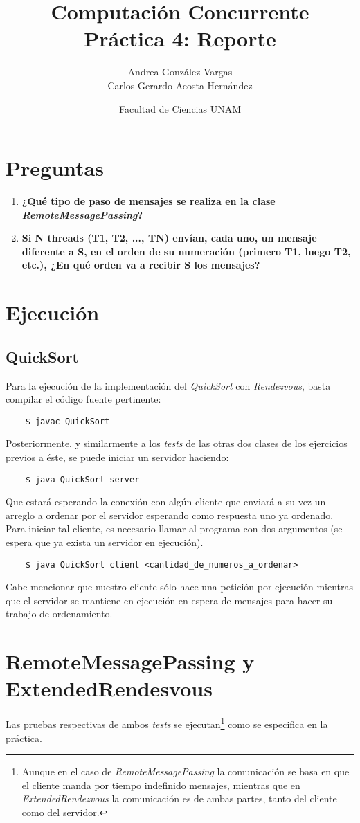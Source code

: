 \documentclass[12pt]{article}
\title{Computación Concurrente \\ Práctica 4: Reporte}
\author{Andrea González Vargas\\Carlos Gerardo Acosta Hernández}
\date{Facultad de Ciencias UNAM}
\begin{document}
\maketitle
\section{Preguntas}
\begin{enumerate}[label=(\alph*)]
\item \textbf{¿Qué tipo de paso de mensajes se realiza en la clase \textit{RemoteMessagePassing}?}\\
  
\item \textbf{Si N threads (T1, T2, ..., TN) envían, cada uno, un mensaje diferente a S, en el orden de su numeración (primero T1, luego T2, etc.), ¿En qué orden va a recibir S los mensajes?}\\
  
\end{enumerate}

\section{Ejecución}
\subsection{QuickSort}
Para la ejecución de la implementación del \textit{QuickSort} con \textit{Rendezvous}, basta
compilar el código fuente pertinente:
\begin{verbatim}
    $ javac QuickSort
\end{verbatim}
Posteriormente, y similarmente a los \textit{tests} de las otras dos clases de los ejercicios previos
a éste, se puede iniciar un servidor haciendo:
\begin{verbatim}
    $ java QuickSort server
\end{verbatim}
Que estará esperando la conexión con algún cliente que enviará a su vez un arreglo a ordenar por el
servidor esperando como respuesta uno ya ordenado.
Para iniciar tal cliente, es necesario llamar al programa con dos argumentos (se espera que ya exista un servidor en ejecución).
\begin{verbatim}
    $ java QuickSort client <cantidad_de_numeros_a_ordenar>
\end{verbatim}
Cabe mencionar que nuestro cliente sólo hace una petición por ejecución mientras que el servidor se mantiene en ejecución en espera de mensajes para hacer su trabajo de ordenamiento.

\section{RemoteMessagePassing y ExtendedRendesvous}
Las pruebas respectivas de ambos \textit{tests} se ejecutan\footnote{Aunque en el caso de \textit{RemoteMessagePassing} la comunicación se basa en que el cliente manda por tiempo indefinido mensajes, mientras que en \textit{ExtendedRendezvous} la comunicación es de ambas partes, tanto del cliente como del servidor.} como se especifica en la práctica.
\end{document}
